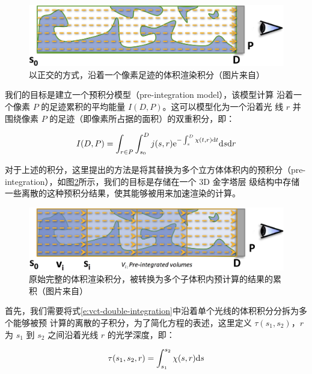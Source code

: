 \begin{figure}
	\includegraphics[width=\textwidth]{figures/vct/vct-7-1}
	\caption{以正交的方式，沿着一个像素足迹的体积渲染积分（图片来自\cite{a:InteractiveIndirectIlluminationUsingVoxelConeTracing}）}
	\label{f:vct-7-1}
\end{figure}

我们的目标是建立一个预积分模型（pre-integration model），该模型计算 沿着一个像素 $P$ 的足迹累积的平均能量 $I(D,P)$。这可以模型化为一个沿着光 线 $r$ 并围绕像素 $P$ 的足迹（即像素所占据的面积）的双重积分，即：

\begin{equation}\label{e:vct-double-integration}
	I(D,P)=\int_{r\in P}\int^{D}_{s_0}j(s,r){\rm e}^{-\int^{D}_s\chi (t,r){\rm d}t}{\rm d}s{\rm d}r
\end{equation}

对于上述的积分，这里提出的方法是将其替换为多个立方体体积内的预积分（pre-integration），如图\ref{f:vct-7-2}所示，我们的目标是存储在一个 3D 金字塔层 级结构中存储一些离散的这种预积分结果，使其能够被用来加速渲染的计算。

\begin{figure}
	\includegraphics[width=\textwidth]{figures/vct/vct-7-2}
	\caption{原始完整的体积渲染积分，被转换为多个子体积内预计算的结果的累积（图片来自\cite{a:InteractiveIndirectIlluminationUsingVoxelConeTracing}）}
	\label{f:vct-7-2}
\end{figure}

首先，我们需要将式\ref{e:vct-double-integration}中沿着单个光线的体积积分分拆为多个能够被预 计算的离散的子积分，为了简化方程的表述，这里定义 $\tau(s_1,s_2)$，$r$ 为 $s_1$ 到 $s_2$ 之间沿着光线 $r$ 的光学深度，即：

\begin{equation}
	\tau(s_1,s_2,r)=\int^{s_2}_{s_1}\chi(s,r){\rm d}s
\end{equation}

